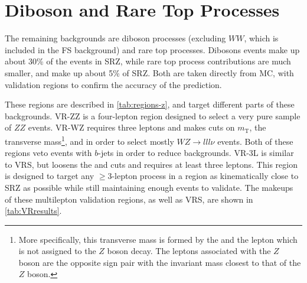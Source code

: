 \section{Diboson and Rare Top Processes}
\label{sec:bg-other}

The remaining backgrounds are diboson processes (excluding $WW$, which is included in the \ac{FS} background) and rare top processes. Dibosons events make up about 30\% of the events in SRZ, while rare top process contributions are much smaller, and make up about 5\% of SRZ. Both are taken directly from \ac{MC}, with validation regions to confirm the accuracy of the prediction. 

These regions are described in \autoref{tab:regions-z}, and target different parts of these backgrounds. VR-ZZ is a four-lepton region designed to select a very pure sample of $ZZ$ events. VR-WZ requires three leptons and makes cuts on $m_\mathrm{T}$, the transverse mass\footnote{More specifically, this transverse mass is formed by the \met and the lepton which is not assigned to the $Z$ boson decay. The leptons associated with the $Z$ boson are the opposite sign pair with the invariant mass closest to that of the $Z$ boson. }, 
and \met in order to select mostly $WZ\rightarrow lll\nu$ events. Both of these regions veto events with $b$-jets in order to reduce \ttbar backgrounds. VR-3L is similar to VRS, but loosens the \HT and \met cuts and requires at least three leptons. This region is designed to target any $\geq3$-lepton process in a region as kinematically close to SRZ as possible while still maintaining enough events to validate. The makeups of these multilepton validation regions, as well as VRS, are shown in \autoref{tab:VRresults}.



